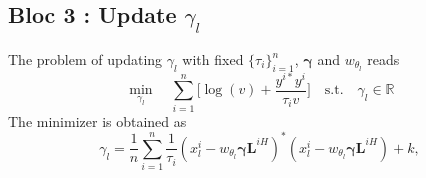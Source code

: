     \subsection*{\textbf{Bloc 3 : Update $\gamma_{l}$}}
        \label{subsection:update_gamma_l}
        \noindent
        The problem of updating $\gamma_{l}$ with fixed $\{\tau_i\}_{i=1}^n$, $\boldsymbol{\gamma}$ and $w_{\theta_{l}}$ reads
        \vspace{-0.5em}
        \begin{equation}
            \label{Equation:problem3}
            \min_{\gamma_{l}} \quad \sum_{i=1}^n \Bigg[ \log\left( v \right) + \frac{y^{i*} y^i}{\tau_i v}  \Bigg] %
            \quad \text{s.t.} \quad  \gamma_{l}  \in \mathbb{R}
        \end{equation} 
        The minimizer is obtained as
        \vspace{-0.1cm}
        \begin{equation}
            \label{Equation:gammaScalar}
            \gamma_{l} = \frac{1}{n} \sum_{i=1}^n \frac{1}{\tau_i} (x_{l}^i - w_{\theta_{l}} \boldsymbol{\gamma} \mathbf{L}^{iH})^*(x_{l}^i - w_{\theta_{l}} \boldsymbol{\gamma} \mathbf{L}^{iH})
            + k ,
        \end{equation}
        \vspace{-0.8cm}
